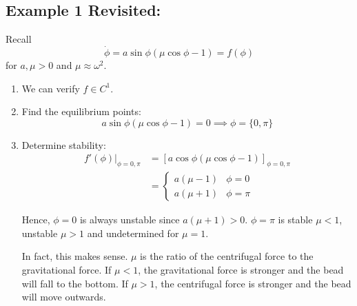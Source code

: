 \documentclass[12pt]{report}
\begin{document}
\subsection*{Example 1 Revisited:} Recall
\[\dot \phi = a \sin \phi(\mu \cos \phi - 1) = f(\phi)\]
for $a, \mu > 0$ and $\mu \approx \omega^2$.

\begin{enumerate}
    \item We can verify $f \in C^1$.

    \item Find the equilibrium points:
          \[a \sin \phi (\mu \cos \phi - 1) = 0 \implies \phi = \{0, \pi\}\]

    \item Determine stability:
          \begin{align*}
              f'(\phi) \bigg\vert_{\phi = 0, \pi} & = \left[a \cos \phi (\mu \cos \phi - 1)\right]_{\phi = 0, \pi} \\
                                                  & = \begin{cases}
                                                          a(\mu - 1) & \phi = 0   \\
                                                          a(\mu + 1) & \phi = \pi
                                                      \end{cases}
          \end{align*}

          Hence, $\phi = 0$ is always unstable since $a(\mu + 1) > 0$. $\phi = \pi$ is stable $\mu < 1$, unstable $\mu > 1$ and undetermined for $\mu = 1$.

          In fact, this makes sense. $\mu$ is the ratio of the centrifugal force to the gravitational force. If $\mu < 1$, the gravitational force is stronger and the bead will fall to the bottom. If $\mu > 1$, the centrifugal force is stronger and the bead will move outwards.

\end{enumerate}
\end{document}
